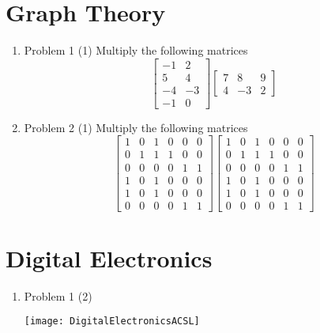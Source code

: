 \documentclass{article}
\begin{document}
\section{Graph Theory}
\begin{enumerate}
    \item {Problem 1 (1) Multiply the following matrices}
    $$
    \begin{bmatrix} 
    -1 & 2 \\
    5 & 4 \\
    -4 & -3 \\
    -1 & 0
    \end{bmatrix}
    \begin{bmatrix} 
    7 & 8 & 9 \\
    4 & -3 & 2 
    \end{bmatrix}
    $$
    \item {Problem 2 (1) Multiply the following matrices}
     $$
    \begin{bmatrix} 
    1 & 0 & 1 & 0 & 0 & 0 \\
    0 & 1 & 1 & 1 & 0 & 0 \\
    0 & 0 & 0 & 0 & 1 & 1\\
    1 & 0 & 1 & 0 & 0 & 0 \\ 
    1 & 0 & 1 & 0 & 0 & 0 \\
    0 & 0 & 0 & 0 & 1 & 1
    \end{bmatrix}
    \begin{bmatrix} 
    1 & 0 & 1 & 0 & 0 & 0 \\
    0 & 1 & 1 & 1 & 0 & 0 \\
    0 & 0 & 0 & 0 & 1 & 1\\
    1 & 0 & 1 & 0 & 0 & 0 \\ 
    1 & 0 & 1 & 0 & 0 & 0 \\
    0 & 0 & 0 & 0 & 1 & 1
    \end{bmatrix}
    $$
\end{enumerate}

\section{Digital Electronics}
\begin{enumerate}
    \item {Problem 1 (2)}
    
    \texttt{[image: DigitalElectronicsACSL]}
\end{enumerate}
\end{document}
